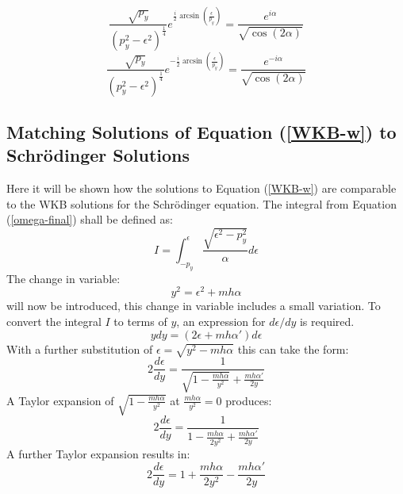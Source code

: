 		\begin{equation}
			\frac{\sqrt{p_{y}}}{\left(p_{y}^{2}-\epsilon^{2}\right)^{\frac{1}{4}}}e^{\frac{i}{2}\arcsin\left(\frac{\epsilon}{p_{y}}\right)}=\frac{e^{i\alpha}}{\sqrt{\cos(2\alpha)}}
		\end{equation}
		\begin{equation}
			\frac{\sqrt{p_{y}}}{\left(p_{y}^{2}-\epsilon^{2}\right)^{\frac{1}{4}}}e^{-\frac{i}{2}\arcsin\left(\frac{\epsilon}{p_{y}}\right)}=\frac{e^{-i\alpha}}{\sqrt{\cos(2\alpha)}}
		\end{equation}
		\subsection{Matching Solutions of Equation (\ref{WKB-w}) to Schr{\" o}dinger Solutions}
		\label{Appendix-Matching-Solutions}
		Here it will be shown how the solutions to Equation (\ref{WKB-w}) are comparable to the WKB solutions for the Schr{\" o}dinger equation. The integral from Equation (\ref{omega-final}) shall be defined as:
		\begin{equation}
			I=\int^{\epsilon}_{-p_{y}}\frac{\sqrt{\epsilon^{2}-p_{y}^{2}}}{\alpha}d\epsilon
		\end{equation}
		The change in variable:
		\begin{equation}
			y^{2}=\epsilon^{2}+mh\alpha
		\end{equation}
		will now be introduced, this change in variable includes a small variation. To convert the integral $I$ to terms of $y$, an expression for $d\epsilon /dy$ is required.
		\begin{equation}
			ydy=\left(2\epsilon+mh\alpha '\right) d\epsilon
		\end{equation}
		With a further substitution of $\epsilon = \sqrt{y^{2}-mh\alpha}$ this can take the form:
		\begin{equation}
			2\frac{d\epsilon}{dy}=\frac{1}{\sqrt{1-\frac{mh\alpha}{y^{2}}}+\frac{mh\alpha '}{2y}}
		\end{equation}
		A Taylor expansion of $\sqrt{1-\frac{mh\alpha}{y^{2}}}$ at $\frac{mh\alpha}{y^{2}}=0$ produces:
		\begin{equation}
			2\frac{d\epsilon}{dy}=\frac{1}{1-\frac{mh\alpha}{2y^{2}}+\frac{mh\alpha '}{2y}}
		\end{equation}
		A further Taylor expansion results in:
		\begin{equation}
			2\frac{d\epsilon}{dy}=1+\frac{mh\alpha}{2y^{2}}-\frac{mh\alpha '}{2y}
		\end{equation}
